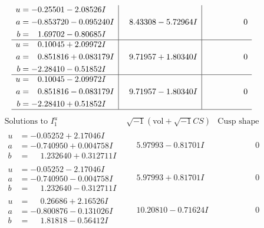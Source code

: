 \documentclass[1p]{elsarticle_modified}
\theoremstyle{definition}
\newcommand{\I}{\sqrt{-1}}
\begin{document}
$$\begin{array}{c|c|c}
\begin{aligned}
u &= -0.25501 - 2.08526 I \\
a &= -0.853720 - 0.095240 I \\
b &= \phantom{-}1.69702 - 0.80685 I\end{aligned}
 & \phantom{-}8.43308 - 5.72964 I & \phantom{-0.000000 } 0 \\ \hline\begin{aligned}
u &= \phantom{-}0.10045 + 2.09972 I \\
a &= \phantom{-}0.851816 + 0.083179 I \\
b &= -2.28410 - 0.51852 I\end{aligned}
 & \phantom{-}9.71957 + 1.80340 I & \phantom{-0.000000 } 0 \\ \hline\begin{aligned}
u &= \phantom{-}0.10045 - 2.09972 I \\
a &= \phantom{-}0.851816 - 0.083179 I \\
b &= -2.28410 + 0.51852 I\end{aligned}
 & \phantom{-}9.71957 - 1.80340 I & \phantom{-0.000000 } 0\\
 \hline 
 \end{array}$$\newpage$$\begin{array}{c|c|c}  
\text{Solutions to }I^u_{1}& \I (\text{vol} + \sqrt{-1}CS) & \text{Cusp shape}\\
 \hline 
\begin{aligned}
u &= -0.05252 + 2.17046 I \\
a &= -0.740950 + 0.004758 I \\
b &= \phantom{-}1.232640 + 0.312711 I\end{aligned}
 & \phantom{-}5.97993 - 0.81701 I & \phantom{-0.000000 } 0 \\ \hline\begin{aligned}
u &= -0.05252 - 2.17046 I \\
a &= -0.740950 - 0.004758 I \\
b &= \phantom{-}1.232640 - 0.312711 I\end{aligned}
 & \phantom{-}5.97993 + 0.81701 I & \phantom{-0.000000 } 0 \\ \hline\begin{aligned}
u &= \phantom{-}0.26686 + 2.16526 I \\
a &= -0.800876 - 0.131026 I \\
b &= \phantom{-}1.81818 - 0.56412 I\end{aligned}
 & \phantom{-}10.20810 - 0.71624 I & \phantom{-0.000000 } 0 \\ \hline\begin{aligned}

\end{aligned}
\end{array}$$
\end{document}
